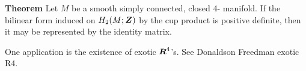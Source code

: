 \documentclass{article}
\newcommand {\Z} {\mbox{\boldmath $Z$}}
\newcommand {\R} {\mbox{\boldmath $R$}}
\begin{document}
{\bf Theorem} Let $M$ be a smooth simply connected, closed 4- manifold.  If the bilinear form induced on $H_2(M;\Z)$ by the cup product is positive definite, then it may be represented by the identity matrix.

One application is the existence of exotic $\R^4$'s.  See Donaldson Freedman exotic R4.
\end{document}
